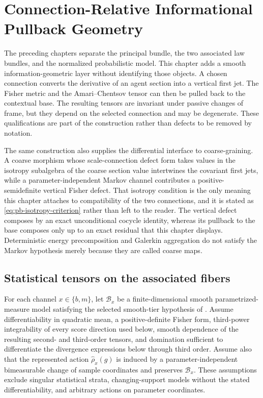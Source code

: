 \chapter{Connection-Relative Informational Pullback Geometry}
\label{ch:pullback-geometry}

The preceding chapters separate the principal bundle, the two associated law
bundles, and the normalized probabilistic model.  This chapter adds a smooth
information-geometric layer without identifying those objects.  A chosen
connection converts the derivative of an agent section into a vertical first
jet.  The Fisher metric and the Amari--Chentsov tensor can then be pulled back
to the contextual base.  The resulting tensors are invariant under passive
changes of frame, but they depend on the selected connection and may be
degenerate.  These qualifications are part of the construction rather than
defects to be removed by notation.

The same construction also supplies the differential interface to
coarse-graining.  A coarse morphism whose scale-connection defect form takes
values in the isotropy subalgebra of the coarse section value intertwines the
covariant first jets, while a parameter-independent Markov channel contributes
a positive-semidefinite vertical Fisher defect.  That isotropy condition is the
only meaning this chapter attaches to compatibility of the two connections, and
it is stated as \eqref{eq:pb-isotropy-criterion} rather than left to the
reader.  The vertical defect composes by an exact unconditional cocycle
identity, whereas its pullback to the base composes only up to an exact
residual that this chapter displays.  Deterministic energy precomposition and
Galerkin aggregation do not satisfy the Markov hypothesis merely because they
are called coarse maps.

\section{Statistical tensors on the associated fibers}
\label{sec:pb-statistical-tensors}

For each channel $x\in\{b,m\}$, let $\mathcal B_x$ be a finite-dimensional
smooth parametrized-measure model satisfying the selected smooth-tier
hypothesis of .  Assume differentiability in
quadratic mean, a positive-definite Fisher form, third-power integrability of
every score direction used below, smooth dependence of the resulting second-
and third-order tensors, and domination sufficient to differentiate the
divergence expressions below through third order.  Assume also that the represented action
$\widehat\rho_x(g)$ is induced by a parameter-independent bimeasurable change
of sample coordinates and preserves $\mathcal B_x$.  These assumptions exclude
singular statistical strata, changing-support models without the stated
differentiability, and arbitrary actions on parameter coordinates.

